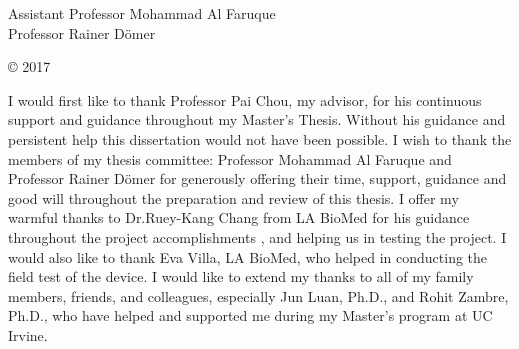 



\othercommitteemembers
{
  Assistant Professor Mohammad Al Faruque\\
  Professor Rainer D{\"o}mer
}


\copyrightdeclaration
{
  {\copyright} {2017} \Authorname
}


  

\acknowledgments
{
  I would first like to thank Professor Pai Chou, my advisor, for his continuous support and guidance throughout my Master's Thesis. Without his guidance and persistent help this dissertation would not have been possible. I wish to thank the members of my thesis committee: Professor Mohammad Al Faruque and Professor Rainer D{\"o}mer for generously offering their time, support, guidance and good will throughout the preparation and review of this thesis. I offer my warmful thanks to Dr.Ruey-Kang Chang  from LA BioMed for his guidance throughout the project accomplishments , and helping us in testing the project. I would also like to thank Eva Villa, LA BioMed, who helped in conducting the field test of the device. I would like to extend my thanks to all of my family members, friends, and colleagues, especially  Jun Luan, Ph.D., and Rohit Zambre, Ph.D., who have helped and supported me during my Master's program at UC Irvine.   
}


